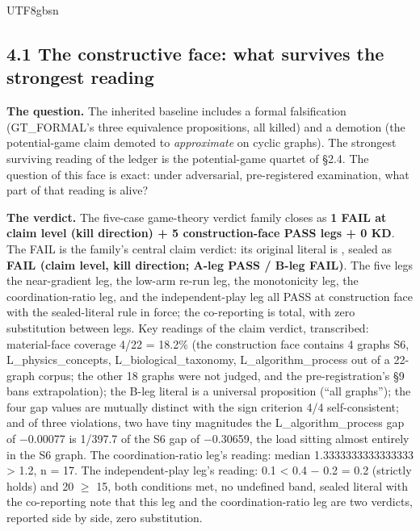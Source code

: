 \documentclass[11pt,letterpaper]{article}
\begin{document}
\begin{CJK}{UTF8}{gbsn}
\subsection*{4.1 The constructive face: what survives the strongest reading}

\textbf{The question.} The inherited baseline includes a formal falsification (GT\_FORMAL's three equivalence propositions, all killed) and a demotion (the potential-game claim demoted to \emph{approximate} on cyclic graphs). The strongest surviving reading of the ledger is the potential-game quartet of \S{}2.4. The question of this face is exact: under adversarial, pre-registered examination, what part of that reading is alive?

\textbf{The verdict.} The five-case game-theory verdict family closes as \textbf{1 FAIL at claim level (kill direction) + 5 construction-face PASS legs + 0 KD}. The FAIL is the family's central claim verdict: its original literal is , sealed as \textbf{FAIL (claim level, kill direction; A-leg PASS / B-leg FAIL)}. The five legs \textemdash{} the near-gradient leg, the low-arm re-run leg, the monotonicity leg, the coordination-ratio leg, and the independent-play leg \textemdash{} all PASS at construction face with the sealed-literal rule in force; the co-reporting is total, with zero substitution between legs. Key readings of the claim verdict, transcribed: material-face coverage 4/22 = 18.2\% (the construction face contains 4 graphs \textemdash{} S6, L\_physics\_concepts, L\_biological\_taxonomy, L\_algorithm\_process \textemdash{} out of a 22-graph corpus; the other 18 graphs were not judged, and the pre-registration's \S{}9 bans extrapolation); the B-leg literal is a universal proposition (``all graphs''); the four gap values are mutually distinct with the sign criterion 4/4 self-consistent; and of three violations, two have tiny magnitudes \textemdash{} the L\_algorithm\_process gap of \ensuremath{-}0.00077 is 1/397.7 of the S6 gap of \ensuremath{-}0.30659, the load sitting almost entirely in the S6 graph. The coordination-ratio leg's reading: median 1.3333333333333333 > 1.2, n = 17. The independent-play leg's reading: 0.1 < 0.4 \ensuremath{-} 0.2 = 0.2 (strictly holds) and 20 \ensuremath{\geq} 15, both conditions met, no undefined band, sealed literal  \textemdash{} with the co-reporting note that this leg and the coordination-ratio leg are two verdicts, reported side by side, zero substitution.


\end{CJK}
\end{document}
